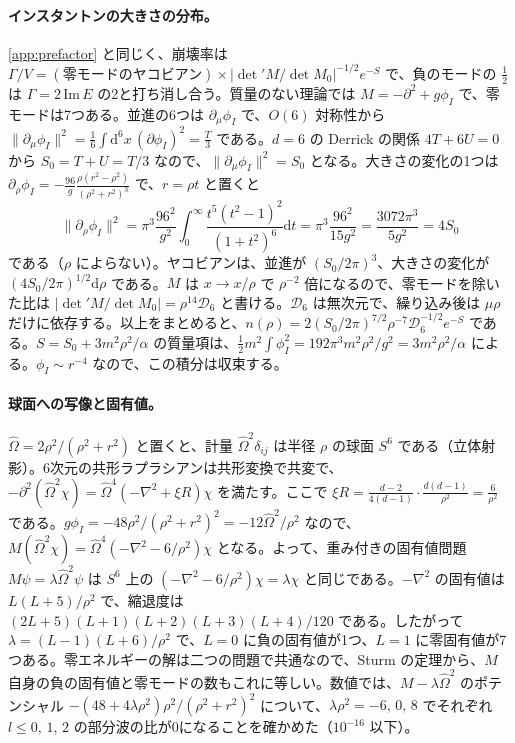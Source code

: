 \documentclass[a4paper,10pt]{ltjsarticle}
\newcommand{\dd}{\mathrm{d}}
\begin{document}
\paragraph{インスタントンの大きさの分布。}\ref{app:prefactor} と同じく、崩壊率は $\Gamma/V=(\text{零モードのヤコビアン})\times|\det'M/\det M_0|^{-1/2}e^{-S}$ で、負のモードの $\frac12$ は $\Gamma=2\,\mathrm{Im}\,E$ の2と打ち消し合う。質量のない理論では $M=-\partial^2+g\phi_I$ で、零モードは7つある。並進の6つは $\partial_\mu\phi_I$ で、$O(6)$ 対称性から $\|\partial_\mu\phi_I\|^2=\frac16\int\dd^6x\,(\partial\phi_I)^2=\frac T3$ である。$d=6$ の Derrick の関係 $4T+6U=0$ から $S_0=T+U=T/3$ なので、$\|\partial_\mu\phi_I\|^2=S_0$ となる。大きさの変化の1つは $\partial_\rho\phi_I=-\frac{96}{g}\frac{\rho(r^2-\rho^2)}{(\rho^2+r^2)^3}$ で、$r=\rho t$ と置くと
\begin{equation*}
\|\partial_\rho\phi_I\|^2=\pi^3\frac{96^2}{g^2}\int_0^\infty\frac{t^5(t^2-1)^2}{(1+t^2)^6}\dd t=\pi^3\frac{96^2}{15g^2}=\frac{3072\pi^3}{5g^2}=4S_0
\end{equation*}
である（$\rho$ によらない）。ヤコビアンは、並進が $(S_0/2\pi)^3$、大きさの変化が $(4S_0/2\pi)^{1/2}\dd\rho$ である。$M$ は $x\to x/\rho$ で $\rho^{-2}$ 倍になるので、零モードを除いた比は $|\det'M/\det M_0|=\rho^{14}\mathcal D_6$ と書ける。$\mathcal D_6$ は無次元で、繰り込み後は $\mu\rho$ だけに依存する。以上をまとめると、$n(\rho)=2(S_0/2\pi)^{7/2}\rho^{-7}\mathcal D_6^{-1/2}e^{-S}$ である。$S=S_0+3m^2\rho^2/\alpha$ の質量項は、$\frac12m^2\int\phi_I^2=192\pi^3m^2\rho^2/g^2=3m^2\rho^2/\alpha$ による。$\phi_I\sim r^{-4}$ なので、この積分は収束する。

\paragraph{球面への写像と固有値。}$\hat\Omega=2\rho^2/(\rho^2+r^2)$ と置くと、計量 $\hat\Omega^2\delta_{ij}$ は半径 $\rho$ の球面 $S^6$ である（立体射影）。6次元の共形ラプラシアンは共形変換で共変で、$-\partial^2(\hat\Omega^2\chi)=\hat\Omega^4(-\nabla^2+\xi R)\chi$ を満たす。ここで $\xi R=\frac{d-2}{4(d-1)}\cdot\frac{d(d-1)}{\rho^2}=\frac6{\rho^2}$ である。$g\phi_I=-48\rho^2/(\rho^2+r^2)^2=-12\hat\Omega^2/\rho^2$ なので、$M(\hat\Omega^2\chi)=\hat\Omega^4(-\nabla^2-6/\rho^2)\chi$ となる。よって、重み付きの固有値問題 $M\psi=\lambda\hat\Omega^2\psi$ は $S^6$ 上の $(-\nabla^2-6/\rho^2)\chi=\lambda\chi$ と同じである。$-\nabla^2$ の固有値は $L(L+5)/\rho^2$ で、縮退度は $(2L+5)(L+1)(L+2)(L+3)(L+4)/120$ である。したがって $\lambda=(L-1)(L+6)/\rho^2$ で、$L=0$ に負の固有値が1つ、$L=1$ に零固有値が7つある。零エネルギーの解は二つの問題で共通なので、Sturm の定理から、$M$ 自身の負の固有値と零モードの数もこれに等しい。数値では、$M-\lambda\hat\Omega^2$ のポテンシャル $-(48+4\lambda\rho^2)\rho^2/(\rho^2+r^2)^2$ について、$\lambda\rho^2=-6,\,0,\,8$ でそれぞれ $l\le0,\,1,\,2$ の部分波の比が0になることを確かめた（$10^{-16}$ 以下）。
\end{document}
